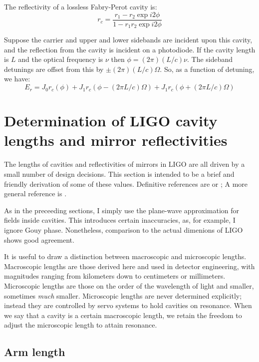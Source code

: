 The reflectivity of a lossless Fabry-Perot cavity is:
\begin{equation}
r_c = \frac{r_1 - r_2 \exp i2\phi}{1 - r_1 r_2 \exp i 2\phi}
\end{equation}

Suppose the carrier and upper and lower sidebands are incident upon this
cavity, and the reflection from the cavity is incident on a photodiode.
If the cavity length is $L$ and the optical frequency is $\nu$ then
$\phi = (2\pi)(L/c)\nu$.  The sideband detunings are offset from this by
$\pm(2\pi)(L/c)\Omega$.  So, as a function of detuning, we have:
%
\begin{equation}
E_r = J_0 r_c(\phi) 
+ J_1 r_c(\phi - (2\pi L/c)\Omega) 
+ J_1 r_c(\phi + (2\pi L/c)\Omega)
\end{equation}


\section{Determination of LIGO cavity lengths and mirror reflectivities}

The lengths of cavities and reflectivities of mirrors in LIGO are all
driven by a small number of design decisions.  This section is
intended to be a brief and friendly derivation of some of these
values.  Definitive references are \cite{LigoFreqResponse97} or
\cite{Fritschel2001Readout}; A more general reference is
\cite{S5InstrumentPaper}.

As in the preceeding sections, I simply use the plane-wave
approximation for fields inside cavities. This introduces certain
inaccuracies, as, for example, I ignore Gouy phase. Nonetheless,
comparison to the actual dimenions of LIGO shows good agreement.

It is useful to draw a distinction between macroscopic and microscopic
lengths. Macroscopic lengths are those derived here and
used in detector engineering, with magnitudes ranging from kilometers
down to centimeters or millimeters. Microscopic lengths are those
on the order of the wavelength of light and smaller, sometimes \emph{much}
smaller. Microscopic lengths are never determined explicitly; instead
they are controlled by servo systems to hold cavities on resonance.
When we say that a cavity is a certain macroscopic length, we retain
the freedom to adjust the microscopic length to attain resonance.

\subsection*{Arm length}

